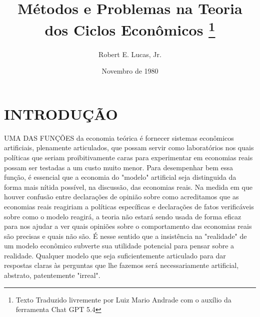 \documentclass[12pt]{article}
\title{Métodos e Problemas na Teoria dos Ciclos Econômicos \thanks{Texto Traduzido livremente por Luiz Mario Andrade com o auxílio da ferramenta Chat GPT 5.4}}
\author{Robert E. Lucas, Jr.}
\date{Novembro de 1980}
\begin{document}
\maketitle

\let\thefootnote\relax{}

\section{INTRODUÇÃO}

UMA DAS FUNÇÕES da economia teórica é fornecer sistemas econômicos artificiais, plenamente articulados, que possam servir como laboratórios nos quais políticas que seriam proibitivamente caras para experimentar em economias reais possam ser testadas a um custo muito menor. Para desempenhar bem essa função, é essencial que a economia do "modelo" artificial seja distinguida da forma mais nítida possível, na discussão, das economias reais. Na medida em que houver confusão entre declarações de opinião sobre como acreditamos que as economias reais reagiriam a políticas específicas e declarações de fatos verificáveis sobre como o modelo reagirá, a teoria não estará sendo usada de forma eficaz para nos ajudar a ver quais opiniões sobre o comportamento das economias reais são precisas e quais não são. É nesse sentido que a insistência na "realidade" de um modelo econômico subverte sua utilidade potencial para pensar sobre a realidade. Qualquer modelo que seja suficientemente articulado para dar respostas claras às perguntas que lhe fazemos será necessariamente artificial, abstrato, patentemente "irreal".
\end{document}

